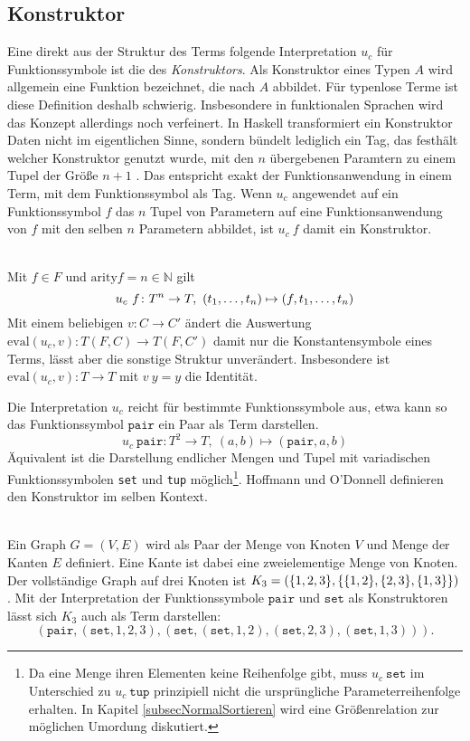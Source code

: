 \subsection{Konstruktor}
Eine direkt aus der Struktur des Terms folgende Interpretation $u_c$ für Funktionssymbole ist die des \emph{Konstruktors}. Als Konstruktor eines Typen $A$ wird allgemein eine Funktion bezeichnet, die nach $A$ abbildet. Für typenlose Terme ist diese Definition deshalb schwierig. Insbesondere in funktionalen Sprachen wird das Konzept allerdings noch verfeinert. In Haskell transformiert ein Konstruktor Daten nicht im eigentlichen Sinne, sondern bündelt lediglich ein Tag, das festhält welcher Konstruktor genutzt wurde, mit den $n$ übergebenen Paramtern zu einem Tupel der Größe $n+1$ \cite{haskellConstructor}. Das entspricht exakt der Funktionsanwendung in einem Term, mit dem Funktionssymbol als Tag. Wenn $u_c$ angewendet auf ein Funktionssymbol $f$ das $n$ Tupel von Parametern auf eine Funktionsanwendung von $f$ mit den selben $n$ Parametern abbildet, ist $u_c~f$ damit ein Konstruktor. 

\begin{definition}~\\
 Mit $f \in F$ und $\mathrm{arity} f = n \in \mathbb N$ 
gilt 
$$u_c~f \colon T^n \rightarrow T, ~(\tOneN) \mapsto (f, \tOneN)$$
Mit einem beliebigen $v \colon C \rightarrow C'$ ändert die Auswertung $\mathrm{eval}(u_c, v) \colon T(F, C) \rightarrow T(F, C')$ damit nur die Konstantensymbole eines Terms, lässt aber die sonstige Struktur unverändert. Insbesondere ist $\mathrm{eval}(u_c, v) \colon T \rightarrow T$ mit $v~y = y$ die Identität.

Die Interpretation $u_c$ reicht für bestimmte Funktionssymbole aus, etwa kann so das Funktionssymbol $\texttt{pair}$ ein Paar als Term darstellen.
$$u_c~\texttt{pair} \colon T^2 \rightarrow T, ~(a, b) \mapsto (\texttt{pair}, a, b)$$
Äquivalent ist die Darstellung endlicher Mengen und Tupel mit variadischen Funktionssymbolen \texttt{set} und \texttt{tup} möglich\footnote{Da eine Menge ihren Elementen keine Reihenfolge gibt, muss $u_c~\texttt{set}$ im Unterschied zu $u_c~\texttt{tup}$ prinzipiell nicht die ursprüngliche Parameterreihenfolge erhalten. In Kapitel \ref{subsecNormalSortieren} wird eine Größenrelation zur möglichen Umordung diskutiert.}. 
Hoffmann und O'Donnell \cite{hoffmann1982programming} definieren den Konstruktor im selben Kontext.
\end{definition}


\begin{beispiel}~\\
Ein Graph $G = (V, E)$ wird als Paar der Menge von Knoten $V$ und Menge der Kanten $E$ definiert. Eine Kante ist dabei eine zweielementige Menge von Knoten. Der vollständige Graph auf drei Knoten ist $K_3 = \paren*{\{1, 2, 3\}, \curl*{\{1, 2\}, \{2, 3\}, \{1, 3\}}}$. Mit der Interpretation der Funktionssymbole $\texttt{pair}$ und $\texttt{set}$ als Konstruktoren lässt sich $K_3$ auch als Term darstellen:
$$(\texttt{pair}, (\texttt{set}, 1, 2, 3), (\texttt{set}, (\texttt{set}, 1, 2), (\texttt{set}, 2, 3), (\texttt{set}, 1, 3))).$$
\end{beispiel}

